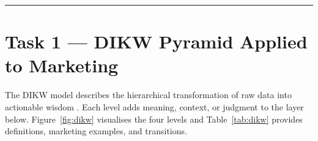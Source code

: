 \documentclass[12pt, a4paper]{article}
\begin{document}
\begin{abstract}
\noindent
This report addresses four learning tasks on data concepts applied to marketing.
\textbf{Task~1} builds a DIKW pyramid illustrating how raw data evolves into
actionable wisdom through successive layers of context, interpretation, and
experience.
\textbf{Task~2} maps the data life cycle across five operational phases.
\textbf{Task~3} presents a comparative table of the four analytics levels:
descriptive, diagnostic, predictive, and prescriptive.
\textbf{Task~4} applies all preceding concepts to the Caf\'{e} Aurora loyalty
campaign, classifying data types, variable types, life cycle phases, and analytics
levels found within the case.
\end{abstract}

{\color{aqRule}\rule{\textwidth}{0.5pt}}
\vspace{6pt}

\section{Task 1 --- DIKW Pyramid Applied to Marketing}

The DIKW model describes the hierarchical transformation of raw data into actionable
wisdom \cite{ackoff1989}. Each level adds meaning, context, or judgment to the layer
below. Figure~\ref{fig:dikw} visualises the four levels and
Table~\ref{tab:dikw} provides definitions, marketing examples, and transitions.
\end{document}
